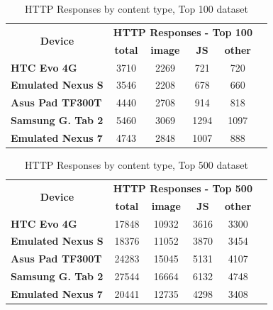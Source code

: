 \documentclass{acm_proc_article-sp}
\begin{document}
\begin{table}[htbp]
  \centering
  \caption{HTTP Responses by content type, Top 100 dataset}
    \begin{tabular}{|c|c|c|c|c|c|}
    \hline
    \multicolumn{1}{|c|}{\multirow{2}[4]{*}{\textbf{Device}}} & \multicolumn{4}{|c|}{\textbf{HTTP Responses - Top 100}} \\ \cline{2-5}
    \multicolumn{1}{|c|}{} & \textbf{total} & \textbf{image} & \textbf{JS} & \textbf{other} \\ \hline
    \multicolumn{1}{|l|}{\textbf{HTC Evo 4G}} & 3710  & 2269  & 721   & 720 \\
    \multicolumn{1}{|l|}{\textbf{Emulated Nexus S}} & 3546  & 2208  & 678   & 660 \\
    \multicolumn{1}{|l|}{\textbf{Asus Pad TF300T}} & 4440  & 2708  & 914   & 818 \\
    \multicolumn{1}{|l|}{\textbf{Samsung G. Tab 2}} & 5460  & 3069  & 1294  & 1097 \\
    \multicolumn{1}{|l|}{\textbf{Emulated Nexus 7}} & 4743  & 2848  & 1007  & 888 \\ \hline
    \end{tabular}%
  \label{tab:http_100}%
\end{table}%

\begin{table}[htbp]
  \centering
  \caption{HTTP Responses by content type, Top 500 dataset}
    \begin{tabular}{|c|c|c|c|c|c|}
    \hline
    \multicolumn{1}{|c|}{\multirow{2}[4]{*}{\textbf{Device}}} & \multicolumn{4}{|c|}{\textbf{HTTP Responses - Top 500}} \\ \cline{2-5}
    \multicolumn{1}{|c|}{} & \textbf{total} & \textbf{image} & \textbf{JS} & \textbf{other} \\ \hline
    \multicolumn{1}{|l|}{\textbf{HTC Evo 4G}} & 17848 & 10932 & 3616  & 3300 \\
    \multicolumn{1}{|l|}{\textbf{Emulated Nexus S}} & 18376 & 11052 & 3870  & 3454 \\
    \multicolumn{1}{|l|}{\textbf{Asus Pad TF300T}} & 24283 & 15045 & 5131  & 4107 \\
    \multicolumn{1}{|l|}{\textbf{Samsung G. Tab 2}} & 27544 & 16664 & 6132  & 4748 \\
    \multicolumn{1}{|l|}{\textbf{Emulated Nexus 7}} & 20441 & 12735 & 4298  & 3408 \\
 \hline
    \end{tabular}%
  \label{tab:http_500}%
\end{table}%
\end{document}
